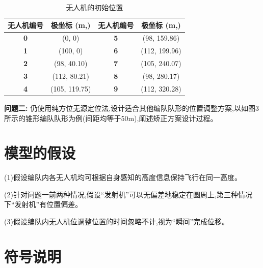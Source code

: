 \documentclass[withoutpreface,bwprint]{cumcmthesis} %
\begin{document}
		\begin{table}[htbp!]
			\small
			\caption{无人机的初始位置}
			\centering
			\renewcommand\arraystretch{4}
			\tabcolsep=0.6cm
			\begin{tabular}{@{}cccc@{}}
				\toprule
				\textbf{无人机编号} & \textbf{极坐标 (m,\textdegree)} & \textbf{无人机编号} & \textbf{极坐标 (m,\textdegree)} \\ \midrule
				\textbf{0}     & (0, 0)             & \textbf{5}     & (98, 159.86)       \\
				\textbf{1}     & (100, 0)           & \textbf{6}     & (112, 199.96)      \\
				\textbf{2}     & (98, 40.10)        & \textbf{7}     & (105, 240.07)      \\
				\textbf{3}     & (112, 80.21)       & \textbf{8}     & (98, 280.17)       \\
				\textbf{4}     & (105, 119.75)      & \textbf{9}     & (112, 320.28)      \\ \bottomrule
			\end{tabular}
		\end{table}
	
	\noindent\textbf{问题二:}
	仍使用纯方位无源定位法,设计适合其他编队队形的位置调整方案,以如图3所示的锥形编队队形为例(间距均等于50m),阐述矫正方案设计过程。
	
%		
	
	\section{模型的假设}
	
	(1)假设编队内各无人机均可根据自身感知的高度信息保持飞行在同一高度。
	
	(2)针对问题一前两种情况,假设“发射机”可以无偏差地稳定在圆周上,第三种情况下“发射机”有位置偏差。
	
	(3)假设编队内无人机位调整位置的时间忽略不计,视为“瞬间”完成位移。
	
	\section{符号说明}
	
\end{document}
